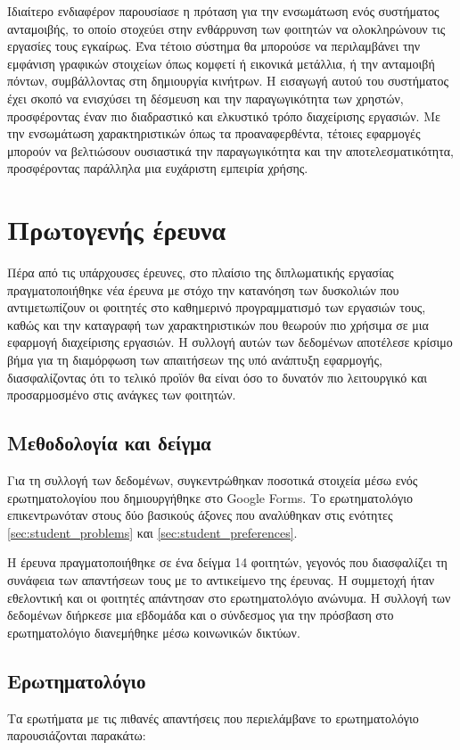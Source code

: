             Ιδιαίτερο ενδιαφέρον παρουσίασε η πρόταση για την ενσωμάτωση ενός συστήματος ανταμοιβής, το οποίο στοχεύει στην ενθάρρυνση των φοιτητών να ολοκληρώνουν τις εργασίες τους εγκαίρως. Ένα τέτοιο σύστημα θα μπορούσε να περιλαμβάνει την εμφάνιση γραφικών στοιχείων όπως κομφετί ή εικονικά μετάλλια, ή την ανταμοιβή πόντων, συμβάλλοντας στη δημιουργία κινήτρων. Η εισαγωγή αυτού του συστήματος έχει σκοπό να ενισχύσει τη δέσμευση και την παραγωγικότητα των χρηστών, προσφέροντας έναν πιο διαδραστικό και ελκυστικό τρόπο διαχείρισης εργασιών. Με την ενσωμάτωση χαρακτηριστικών όπως τα προαναφερθέντα, τέτοιες εφαρμογές μπορούν να βελτιώσουν ουσιαστικά την παραγωγικότητα και την αποτελεσματικότητα, προσφέροντας παράλληλα μια ευχάριστη εμπειρία χρήσης.

    \section{Πρωτογενής έρευνα}
        Πέρα από τις υπάρχουσες έρευνες, στο πλαίσιο της διπλωματικής εργασίας πραγματοποιήθηκε νέα έρευνα με στόχο την κατανόηση των δυσκολιών που αντιμετωπίζουν οι φοιτητές στο καθημερινό προγραμματισμό των εργασιών τους, καθώς και την καταγραφή των χαρακτηριστικών που θεωρούν πιο χρήσιμα σε μια εφαρμογή διαχείρισης εργασιών. Η συλλογή αυτών των δεδομένων αποτέλεσε κρίσιμο βήμα για τη διαμόρφωση των απαιτήσεων της υπό ανάπτυξη εφαρμογής, διασφαλίζοντας ότι το τελικό προϊόν θα είναι όσο το δυνατόν πιο λειτουργικό και προσαρμοσμένο στις ανάγκες των φοιτητών.

        \subsection{Μεθοδολογία και δείγμα}
            Για τη συλλογή των δεδομένων, συγκεντρώθηκαν ποσοτικά στοιχεία μέσω ενός ερωτηματολογίου που δημιουργήθηκε στο Google Forms. Το ερωτηματολόγιο επικεντρωνόταν στους δύο βασικούς άξονες που αναλύθηκαν στις ενότητες \ref{sec:student_problems} και \ref{sec:student_preferences}.

            Η έρευνα πραγματοποιήθηκε σε ένα δείγμα 14 φοιτητών, γεγονός που διασφαλίζει τη συνάφεια των απαντήσεων τους με το αντικείμενο της έρευνας. Η συμμετοχή ήταν εθελοντική και οι φοιτητές απάντησαν στο ερωτηματολόγιο ανώνυμα. Η συλλογή των δεδομένων διήρκεσε μια εβδομάδα και ο σύνδεσμος για την πρόσβαση στο ερωτηματολόγιο διανεμήθηκε μέσω κοινωνικών δικτύων.

        \subsection{Ερωτηματολόγιο}
            Τα ερωτήματα με τις πιθανές απαντήσεις που περιελάμβανε το ερωτηματολόγιο παρουσιάζονται παρακάτω:


